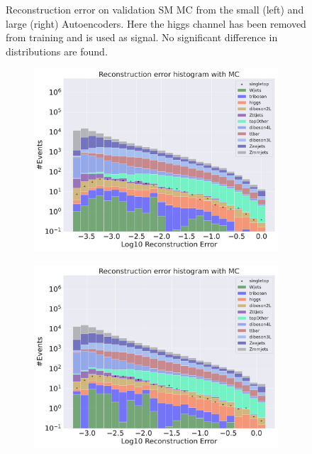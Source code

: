 \begin{figure}[H]
\begin{subfigure}{.45\textwidth}
        \caption{ }
        \label{fig:ae_big_higgs}
    \end{subfigure}
    \hfill 
    \caption[AE | Reconstruction error using Higgs channel as signal]{Reconstruction error on validation SM MC from the small (left) and large (right) Autoencoders. Here the higgs channel has been removed from training and 
    is used as signal. No significant difference in distributions are found.  } 
    \label{fig:ae_big_channel_1}
    
\end{figure}

\begin{figure}[H]
    \centering
    \begin{subfigure}{.45\textwidth}
        \includegraphics[width=\textwidth]{Figures/AE_testing/small/b_data_recon_big_rm3_feats_sig_singletop.pdf}
        \caption{}
        \label{fig:ae_small_singletop}
    \end{subfigure}
    \hfill
    \begin{subfigure}{.45\textwidth}
        \includegraphics[width=\textwidth]{Figures/AE_testing/big/b_data_recon_big_rm3_feats_sig_singletop.pdf}

\end{subfigure}
\end{figure}

